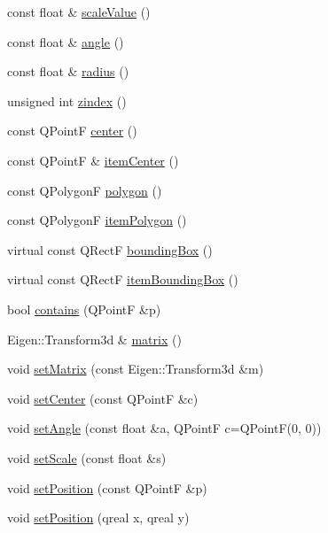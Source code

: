 \begin{CompactItemize}
\item 
const float \& \hyperlink{class_k_g_l_base_item_eeb20ccf94f92b5813a291cd2436dd63}{scaleValue} ()
\item 
const float \& \hyperlink{class_k_g_l_base_item_e81d2c64201c36247fa1d0fda08052c6}{angle} ()
\item 
const float \& \hyperlink{class_k_g_l_base_item_80a9678e8406bdd261cea2aaa8d687a7}{radius} ()
\item 
unsigned int \hyperlink{class_k_g_l_base_item_22da0f3dbc3522a836980df6f8e96def}{zindex} ()
\item 
const QPointF \hyperlink{class_k_g_l_base_item_756267078e458ee97974bc610ff332b1}{center} ()
\item 
const QPointF \& \hyperlink{class_k_g_l_base_item_36470fb553034ab369b5d9349f2590ca}{itemCenter} ()
\item 
const QPolygonF \hyperlink{class_k_g_l_base_item_87a09a44afa6e73baa9aa6d30e81a163}{polygon} ()
\item 
const QPolygonF \hyperlink{class_k_g_l_base_item_9f428b73219decd7b0682db7baab258c}{itemPolygon} ()
\item 
virtual const QRectF \hyperlink{class_k_g_l_base_item_b0b84c51ad212eae0873afa956ace7cf}{boundingBox} ()
\item 
virtual const QRectF \hyperlink{class_k_g_l_base_item_0b12fe848be4194ccd67464d63ab4d25}{itemBoundingBox} ()
\item 
bool \hyperlink{class_k_g_l_base_item_d69c3373e2bc0d47881dff95456c1bbc}{contains} (QPointF \&p)
\item 
Eigen::Transform3d \& \hyperlink{class_k_g_l_base_item_a42b375ad542d3e64eb7aee95d9e6385}{matrix} ()
\item 
void \hyperlink{class_k_g_l_base_item_1897bc88d905d28ff05ac177c0619060}{setMatrix} (const Eigen::Transform3d \&m)
\item 
void \hyperlink{class_k_g_l_base_item_85c4af1445672402e3b47735e2bbf415}{setCenter} (const QPointF \&c)
\item 
void \hyperlink{class_k_g_l_base_item_a281df5a9d5d601635956268809bc67e}{setAngle} (const float \&a, QPointF c=QPointF(0, 0))
\item 
void \hyperlink{class_k_g_l_base_item_d3b52ffc2c83b762a2bd0d678215295e}{setScale} (const float \&s)
\item 
void \hyperlink{class_k_g_l_base_item_05ad2bc6e34005638626afda94f53269}{setPosition} (const QPointF \&p)
\item 
void \hyperlink{class_k_g_l_base_item_f9b1881b93773e84b1a2bd1483183d2e}{setPosition} (qreal x, qreal y)

\end{CompactItemize}
